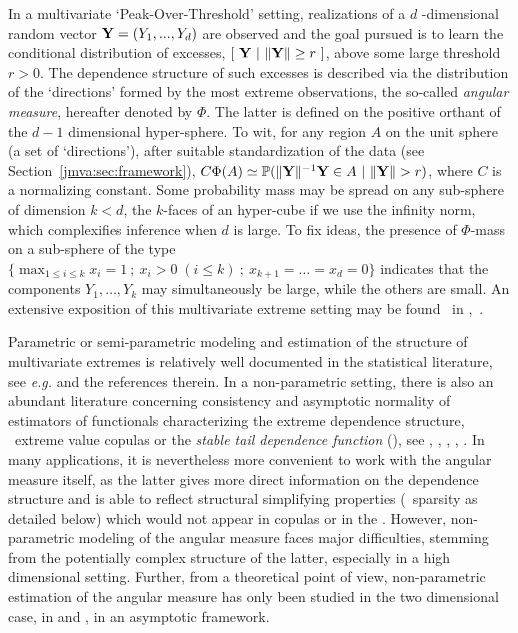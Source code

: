 In a multivariate `Peak-Over-Threshold' setting, realizations of a $d$ -dimensional random vector $\mathbf Y = (Y_1 ,..., Y_d)$ are observed and the goal pursued is to learn the conditional distribution of excesses, $\left[~ \mathbf Y ~|~ \|\mathbf Y\| \ge  r ~ \right]$, above some large threshold $ r>0$.
The dependence structure of such excesses is described via the
distribution of the ‘directions’ formed by the most extreme
observations, the  so-called \emph{angular measure}, hereafter denoted by $\Phi$.  The latter
is defined on the positive orthant of the $d-1$ dimensional
hyper-sphere. To wit, for any region $A$  on the unit sphere (a set
of `directions'), after suitable standardization of the data (see
 Section~\ref{jmva:sec:framework}), 
$C \Phi(A) \simeq \mathbb{P}(\|\mathbf Y\|^{-1} \mathbf Y \in A ~|~ \|\mathbf Y\| >r)$, where $C$ is a normalizing constant. 
Some probability mass may be spread on any sub-sphere of dimension $k
< d$, the $k$-faces of an hyper-cube if we use the infinity norm, which
complexifies inference when $d$ is large. To fix ideas, the presence of $\Phi$-mass on a
sub-sphere of the type $\{\max_{1\leq i\leq k} x_i = 1 ~;~   x_i >0 \;(i\le k) ~;~  x_{k+1} = \ldots = x_d = 0\}$ indicates that the components $Y_1,\ldots,Y_k$ may
simultaneously be large, while the others are small.
An extensive exposition of this multivariate extreme setting may be found \eg~in \cite{Resnick1987},~\cite{BGTS04}. 



Parametric or semi-parametric modeling and estimation of the structure of
multivariate extremes is relatively well documented in the statistical literature, see \emph{e.g.} \cite{coles1991modeling,fougeres2009models,cooley2010pairwise,sabourinNaveau2012} and the references therein. In a non-parametric setting, there is also an abundant literature concerning consistency and asymptotic normality of estimators of functionals characterizing the extreme dependence structure, \eg~extreme value copulas or the \emph{stable tail dependence function} (\stdf), see \cite{Segers12Bernoulli}, \cite{Drees98}, \cite{Embrechts2000}, \cite{Einmahl2012}, \cite{dHF06}. 
In many applications, it is nevertheless more convenient to work with the angular measure itself, as the latter gives more direct information on the dependence structure and is able to reflect structural simplifying properties (\eg~sparsity as detailed below) which would not appear in copulas or in the \stdf.
However, non-parametric modeling of the angular measure faces major difficulties, stemming from the potentially complex structure of the latter, especially in a high dimensional setting.
Further, from a theoretical point of view, non-parametric estimation of the angular measure has only been studied in the two dimensional case, in \cite{Einmahl2001} and \cite{Einmahl2009}, in an asymptotic framework.

